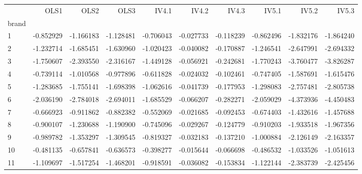\begin{tabular}{lrrrrrrrrr}
\toprule
{} &      OLS1 &      OLS2 &      OLS3 &     IV4.1 &     IV4.2 &     IV4.3 &     IV5.1 &     IV5.2 &     IV5.3 \\
brand &           &           &           &           &           &           &           &           &           \\
\midrule
1     & -0.852929 & -1.166183 & -1.128481 & -0.706043 & -0.027733 & -0.118239 & -0.862496 & -1.832176 & -1.864240 \\
2     & -1.232714 & -1.685451 & -1.630960 & -1.020423 & -0.040082 & -0.170887 & -1.246541 & -2.647991 & -2.694332 \\
3     & -1.750607 & -2.393550 & -2.316167 & -1.449128 & -0.056921 & -0.242681 & -1.770243 & -3.760477 & -3.826287 \\
4     & -0.739114 & -1.010568 & -0.977896 & -0.611828 & -0.024032 & -0.102461 & -0.747405 & -1.587691 & -1.615476 \\
5     & -1.283685 & -1.755141 & -1.698398 & -1.062616 & -0.041739 & -0.177953 & -1.298083 & -2.757481 & -2.805738 \\
6     & -2.036190 & -2.784018 & -2.694011 & -1.685529 & -0.066207 & -0.282271 & -2.059029 & -4.373936 & -4.450483 \\
7     & -0.666923 & -0.911862 & -0.882382 & -0.552069 & -0.021685 & -0.092453 & -0.674403 & -1.432616 & -1.457688 \\
8     & -0.900107 & -1.230688 & -1.190900 & -0.745096 & -0.029267 & -0.124779 & -0.910203 & -1.933518 & -1.967356 \\
9     & -0.989782 & -1.353297 & -1.309545 & -0.819327 & -0.032183 & -0.137210 & -1.000884 & -2.126149 & -2.163357 \\
10    & -0.481135 & -0.657841 & -0.636573 & -0.398277 & -0.015644 & -0.066698 & -0.486532 & -1.033526 & -1.051613 \\
11    & -1.109697 & -1.517254 & -1.468201 & -0.918591 & -0.036082 & -0.153834 & -1.122144 & -2.383739 & -2.425456 \\
\bottomrule
\end{tabular}

